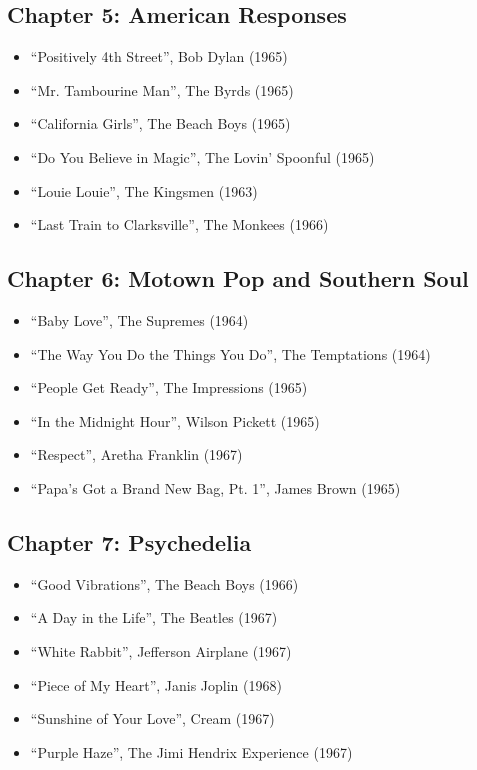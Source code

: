 \documentclass[12pt, a4paper]{book}
\begin{document}
\subsection*{Chapter 5: American Responses}
\begin{itemize}
    \item ``Positively 4th Street'', Bob Dylan (1965)
    \item ``Mr. Tambourine Man'', The Byrds (1965)
    \item ``California Girls'', The Beach Boys (1965)
    \item ``Do You Believe in Magic'', The Lovin' Spoonful (1965)
    \item ``Louie Louie'', The Kingsmen (1963)
    \item ``Last Train to Clarksville'', The Monkees (1966)
\end{itemize}

\subsection*{Chapter 6: Motown Pop and Southern Soul}
\begin{itemize}
    \item ``Baby Love'', The Supremes (1964)
    \item ``The Way You Do the Things You Do'', The Temptations (1964)
    \item ``People Get Ready'', The Impressions (1965)
    \item ``In the Midnight Hour'', Wilson Pickett (1965)
    \item ``Respect'', Aretha Franklin (1967)
    \item ``Papa's Got a Brand New Bag, Pt. 1'', James Brown (1965)
\end{itemize}

\subsection*{Chapter 7: Psychedelia}
\begin{itemize}
    \item ``Good Vibrations'', The Beach Boys (1966)
    \item ``A Day in the Life'', The Beatles (1967)
    \item ``White Rabbit'', Jefferson Airplane (1967)
    \item ``Piece of My Heart'', Janis Joplin (1968)
    \item ``Sunshine of Your Love'', Cream (1967)
    \item ``Purple Haze'', The Jimi Hendrix Experience (1967)
\end{itemize}
\end{document}
